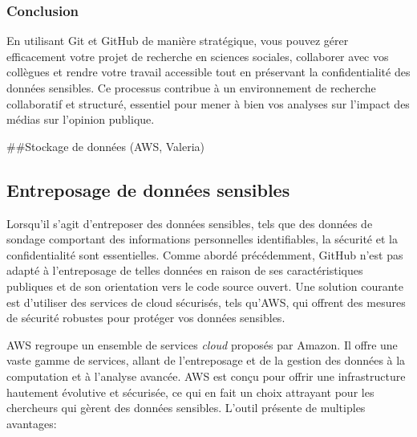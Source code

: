 \documentclass[
  letterpaper,
]{scrbook}
\begin{document}
\hypertarget{conclusion-1}{%
\subsubsection{Conclusion}\label{conclusion-1}}

En utilisant Git et GitHub de manière stratégique, vous pouvez gérer
efficacement votre projet de recherche en sciences sociales, collaborer
avec vos collègues et rendre votre travail accessible tout en préservant
la confidentialité des données sensibles. Ce processus contribue à un
environnement de recherche collaboratif et structuré, essentiel pour
mener à bien vos analyses sur l'impact des médias sur l'opinion
publique.

\#\#Stockage de données (AWS, Valeria)

\hypertarget{entreposage-de-donnuxe9es-sensibles}{%
\subsection{Entreposage de données
sensibles}\label{entreposage-de-donnuxe9es-sensibles}}

Lorsqu'il s'agit d'entreposer des données sensibles, tels que des
données de sondage comportant des informations personnelles
identifiables, la sécurité et la confidentialité sont essentielles.
Comme abordé précédemment, GitHub n'est pas adapté à l'entreposage de
telles données en raison de ses caractéristiques publiques et de son
orientation vers le code source ouvert. Une solution courante est
d'utiliser des services de cloud sécurisés, tels qu'AWS, qui offrent des
mesures de sécurité robustes pour protéger vos données sensibles.

AWS regroupe un ensemble de services \emph{cloud} proposés par Amazon.
Il offre une vaste gamme de services, allant de l'entreposage et de la
gestion des données à la computation et à l'analyse avancée. AWS est
conçu pour offrir une infrastructure hautement évolutive et sécurisée,
ce qui en fait un choix attrayant pour les chercheurs qui gèrent des
données sensibles. L'outil présente de multiples avantages:
\end{document}

